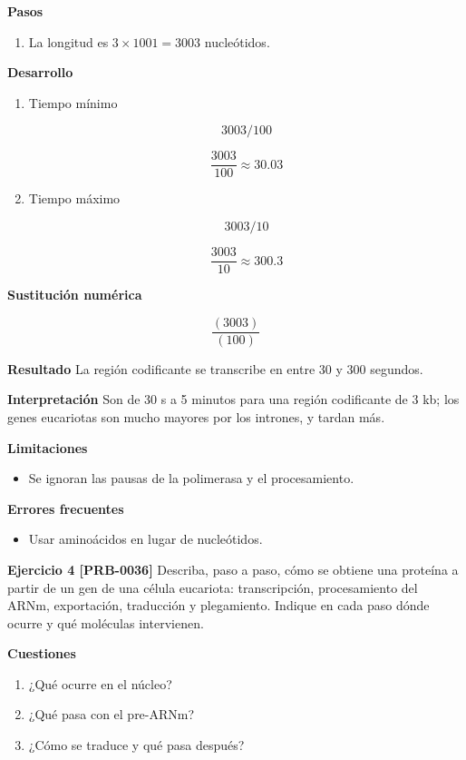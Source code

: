 \documentclass{book}
\begin{document}
\noindent\textbf{Pasos}
\begin{enumerate}
\item
La longitud es \(3 \times 1001 = 3003\) nucleótidos.

\end{enumerate}

\noindent\textbf{Desarrollo}
\begin{enumerate}
\item
Tiempo mínimo


\[
3003/100
\]

\[
\frac{3003}{100} \approx 30.03
\]
\item
Tiempo máximo


\[
3003/10
\]

\[
\frac{3003}{10} \approx 300.3
\]
\end{enumerate}

\noindent\textbf{Sustitución numérica}

\[
\frac{\left(3003\right)}{\left(100\right)}
\]

\noindent\textbf{Resultado}
La región codificante se transcribe en entre 30 y 300 segundos.


\noindent\textbf{Interpretación}
Son de 30 s a 5 minutos para una región codificante de 3 kb; los genes eucariotas son mucho mayores por los intrones, y tardan más.


\noindent\textbf{Limitaciones}
\begin{itemize}
\item Se ignoran las pausas de la polimerasa y el procesamiento.
\end{itemize}

\noindent\textbf{Errores frecuentes}
\begin{itemize}
\item Usar aminoácidos en lugar de nucleótidos.
\end{itemize}

\noindent\textbf{Ejercicio 4 [PRB-0036]}
Describa, paso a paso, cómo se obtiene una proteína a partir de un gen de una célula eucariota: transcripción, procesamiento del ARNm, exportación, traducción y plegamiento. Indique en cada paso dónde ocurre y qué moléculas intervienen.


\noindent\textbf{Cuestiones}
\begin{enumerate}
\item ¿Qué ocurre en el núcleo?
\item ¿Qué pasa con el pre-ARNm?
\item ¿Cómo se traduce y qué pasa después?
\end{enumerate}
\end{document}
